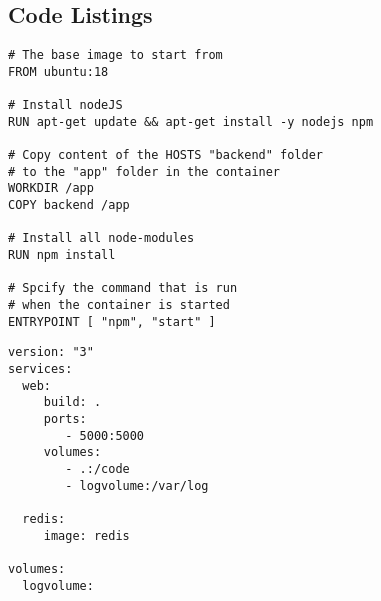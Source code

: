 
\subsection{Code Listings}
\begin{lstlisting}[language=docker, frame=single, caption={Exemplary NodeJS Dockerfile},label=code::docker]
# The base image to start from
FROM ubuntu:18

# Install nodeJS
RUN apt-get update && apt-get install -y nodejs npm

# Copy content of the HOSTS "backend" folder
# to the "app" folder in the container
WORKDIR /app
COPY backend /app

# Install all node-modules
RUN npm install

# Spcify the command that is run
# when the container is started
ENTRYPOINT [ "npm", "start" ]

\end{lstlisting}


\begin{lstlisting}[language=docker-compose-2,caption={Example docker-compose.yml},breaklines=true,label={code::compose}]
version: "3"
services:
  web:
     build: .
     ports:
        - 5000:5000
     volumes:
        - .:/code
        - logvolume:/var/log

  redis:
     image: redis

volumes:
  logvolume:
\end{lstlisting}
